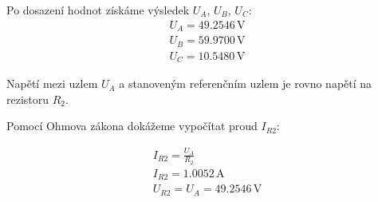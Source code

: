 Po dosazení hodnot získáme výsledek \( U_A \), \( U_B \), \( U_C \):
\nopagebreak
\[
\begin{array}{l}
U_A = 49.2546 \, \mathrm{V} \\
U_B = 59.9700 \, \mathrm{V} \\
U_C = 10.5480 \, \mathrm{V}
\end{array}
\]

Napětí mezi uzlem \( U_A \) a stanoveným referenčním uzlem je rovno napětí na rezistoru \( R_2 \).

Pomocí Ohmova zákona dokážeme vypočítat proud \( I_{R2} \):

\nopagebreak
\[
\begin{array}{l}
I_{R2} = \frac{U_A}{R_2} \\
I_{R2} = 1.0052 \, \mathrm{A} \\
U_{R2} = U_A = 49.2546 \, \mathrm{V}
\end{array}
\]